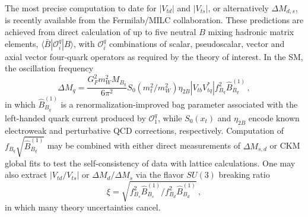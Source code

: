 The most precise computation to date for $|V_{td}|$ and $|V_{ts}|$, or alternatively $\Delta M_{d,s}$, is recently available from the Fermilab/MILC collaboration. These predictions are achieved from direct calculation of up to five neutral $B$ mixing hadronic matrix elements, $\langle \bar{B} | \mathcal{O}^q_i | B\rangle$, with $\mathcal{O}^q_i$ combinations of scalar, pseudoscalar, vector and axial vector four-quark operators as required by the theory of interest. In the SM, the oscillation frequency
\begin{equation}
	\label{eqn:SMDM}
	\Delta M_q = \frac{G_F^2 m_W^2 M_{B_q}}{6 \pi^2} S_0(m_t^2/m_W^2) \eta_{2 B}|V_{tb}V^*_{tq}| f_{B_q}^2 \hat{B}^{(1)}_{B_q}\,,
\end{equation}
in which $\hat{B}^{(1)}_{B_q}$ is a renormalization-improved bag parameter associated with the left-handed quark current produced by $\mathcal{O}^q_1$, while $S_0(x_t)$ and $\eta_{2B}$ encode known electroweak and perturbative QCD corrections, respectively. Computation of $f_{B_q}\sqrt{\hat{B}^{(1)}_{B_q}}$ may be combined with either direct measurements of $\Delta M_{s,d}$ or CKM global fits to test the self-consistency of data with lattice calculations. One may also extract $|V_{td}/V_{ts}|$ or $\Delta M_d/\Delta M_s$ via the flavor $SU(3)$ breaking ratio 
\begin{equation}
\xi = \sqrt{f_{B_s}^2 \hat{B}^{(1)}_{B_s}/ f_{B_d}^2 \hat{B}^{(1)}_{B_d}}\,,
\end{equation}
in which many theory uncertainties cancel.


